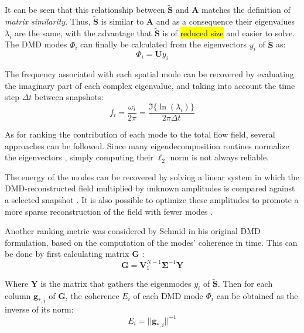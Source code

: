 It can be seen that this relationship between $\widetilde{\mathbf{S}}$ and $\mathbf A$ matches the definition of \emph{matrix similarity}. Thus, $\widetilde{\mathbf{S}}$ is similar to $\mathbf A$ and as a consequence their eigenvalues $\lambda_i$ are the same, with the advantage that $\widetilde{\mathbf{S}}$ is of \hl{reduced size} and easier to solve. The DMD modes $\Phi_i$ can finally be calculated from the eigenvectors $y_i$ of $\widetilde{\mathbf{S}}$ as:
\begin{equation}
	\Phi_i = \mathbf U y_i
\end{equation}

The frequency associated with each spatial mode can be recovered by evaluating the imaginary part of each complex eigenvalue, and taking into account the time step $\Delta t$ between snapshots:
\begin{equation}
	f_i = \frac{\omega_i}{2\pi} = \frac{\Im\{\ln(\lambda_i)\}}{2\pi\Delta t}
\end{equation}

As for ranking the contribution of each mode to the total flow field, several approaches can be followed. Since many eigendecomposition routines normalize the eigenvectors \cite{futrzynski2015dymode}, simply computing their $\ell_2$ norm is not always reliable. 

The energy of the modes can be recovered by solving a linear system in which the DMD-reconstructed field multiplied by unknown amplitudes is compared against a selected snapshot \cite{futrzynski2015dymode}. It is also possible to optimize these amplitudes to promote a more sparse reconstruction of the field with fewer modes \cite{jovanovic2014sparsity}. 

Another ranking metric was considered by Schmid \cite{schmid2010dynamic} in his original DMD formulation, based on the computation of the modes' coherence in time. This can be done by first calculating matrix $\mathbf G$ \cite{delorne2014dynamic}:
\begin{equation}
	\mathbf G=\mathbf V_1^{N-1}\bm\Sigma^{-1} \mathbf Y
\end{equation}

Where $\mathbf Y$ is the matrix that gathers the eigenmodes $y_i$ of $\widetilde{\mathbf{S}}$. Then for each column $\mathbf g_{*,i}$ of $\mathbf G$, the coherence $E_i$ of each DMD mode $\Phi_i$ can be obtained as the inverse of its norm:
\begin{equation}
	E_i = ||\mathbf g_{*,i}||^{-1}
\end{equation}

